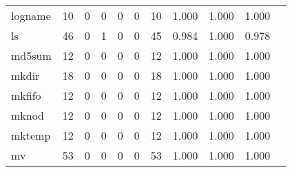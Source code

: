 \begin{longtable}{lp{1.10cm}p{1.10cm}p{1.10cm}p{1.10cm}p{1.10cm}p{1.10cm}p{1.10cm}p{1.10cm}p{1.10cm}p{1.10cm}}
logname   &                     10 &                                  0 &                                 0 &                                0 &                                 0 &                              10 &                          1.000 &                                 1.000 &                               1.000 \\
ls        &                     46 &                                  0 &                                 1 &                                0 &                                 0 &                              45 &                          0.984 &                                 1.000 &                               0.978 \\
md5sum    &                     12 &                                  0 &                                 0 &                                0 &                                 0 &                              12 &                          1.000 &                                 1.000 &                               1.000 \\
mkdir     &                     18 &                                  0 &                                 0 &                                0 &                                 0 &                              18 &                          1.000 &                                 1.000 &                               1.000 \\
mkfifo    &                     12 &                                  0 &                                 0 &                                0 &                                 0 &                              12 &                          1.000 &                                 1.000 &                               1.000 \\
mknod     &                     12 &                                  0 &                                 0 &                                0 &                                 0 &                              12 &                          1.000 &                                 1.000 &                               1.000 \\
mktemp    &                     12 &                                  0 &                                 0 &                                0 &                                 0 &                              12 &                          1.000 &                                 1.000 &                               1.000 \\
mv        &                     53 &                                  0 &                                 0 &                                0 &                                 0 &                              53 &                          1.000 &                                 1.000 &                               1.000 \\

\end{longtable}
